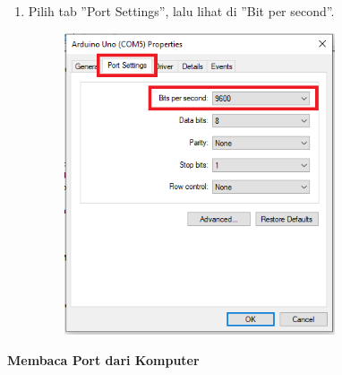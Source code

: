 \begin{enumerate}
	\item Pilih tab ''Port Settings'', lalu lihat di ''Bit per second''.
	\begin{figure}[H]
		\includegraphics[width=8cm]{figures/5/1174006/Teori/d4.png}
		\centering
	\end{figure}
\end{enumerate}


\hfill \break
\textbf{Membaca Port dari Komputer}

